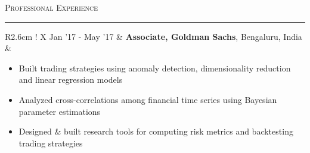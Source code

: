 \documentclass[8pt,a4paper,English]{article}
\newcommand{\lv}{\color{table-border}\vrule}
\newcommand\roottitle[1]{ \vspace{3mm} \noindent \textsc{ \normalsize #1} \vspace{1.5mm} \nopagebreak[4] \color{gray} \hrule \color{black} \vspace{2mm} \noindent \small }
\begin{document}
\roottitle{Professional Experience}
\renewcommand{\arraystretch}{1.2}
\setlength\tabcolsep{8pt}
\begin{tabularx}{\textwidth}{ R{2.6cm} !{\lv} X }
  Jan '17 - May '17 & \textbf{Associate, Goldman Sachs}, Bengaluru, India \\
					& \begin{minipage}[t]{0.8\textwidth}
						\begin{itemize}[label={--},leftmargin=*]
						\setlength\itemsep{-10pt}
						\item Built trading strategies using anomaly detection, dimensionality reduction and linear regression models \\
						\item Analyzed cross-correlations among financial time series using Bayesian parameter estimations \\
						\item Designed \& built research tools for computing risk metrics and backtesting trading strategies \\[-4pt]
						\end{itemize} 
						\end{minipage} \\


\end{tabularx}
\end{document}
